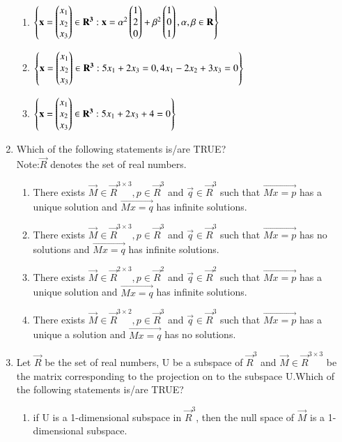 \documentclass[journal,12pt,onecolumn]{IEEEtran}
\theoremstyle{remark}
\begin{document}
\begin{enumerate}
\begin{enumerate}
      \item  $\left\{\mathbf{x}=\begin{pmatrix}x_1\\x_2\\x_3\end{pmatrix} \in \mathbf{R^3}:\mathbf{x}=\alpha^2 \begin{pmatrix}1\\2\\0\end{pmatrix}+\beta^2 \begin{pmatrix}1\\0\\1\end{pmatrix},\alpha,\beta \in \mathbf{R}\right\}$
      \item  $\left\{\mathbf{x}=\begin{pmatrix}x_1\\x_2\\x_3\end{pmatrix} \in \mathbf{R^3}: 5x_1+2x_3=0,4x_1-2x_2+3x_3=0\right\}$
      \item  $\left\{\mathbf{x}=\begin{pmatrix}x_1\\x_2\\x_3\end{pmatrix} \in \mathbf{R^3}:5x_1+2x_3+4=0\right\}$
  \end{enumerate}
  \item Which of the following statements is/are TRUE?\\
  Note:$\vec{R}$ denotes the set of real numbers.
  \begin{enumerate}
      \item There exists $\vec{M}\in \vec{R}^{3\times3},p\in \vec{R}^{3}$ and $\vec{q} \in \vec{R}^3$ such that $\vec{Mx=p}$ has a unique solution and $\vec{Mx=q}$ has infinite solutions.
      \item There exists $\vec{M}\in \vec{R}^{3\times3},p\in \vec{R}^{3}$ and $\vec{q} \in \vec{R}^3$ such that $\vec{Mx=p}$ has no solutions and $\vec{Mx=q}$ has infinite solutions.
      \item There exists $\vec{M}\in \vec{R}^{2\times3},p\in \vec{R}^{2}$ and $\vec{q} \in \vec{R}^2$ such that $\vec{Mx=p}$ has a unique solution and $\vec{Mx=q}$ has infinite solutions.
      \item There exists $\vec{M}\in \vec{R}^{3\times2},p\in \vec{R}^{3}$ and $\vec{q} \in \vec{R}^3$ such that $\vec{Mx=p}$ has a unique a  solution and $\vec{Mx=q}$ has no solutions.
  \end{enumerate}
  \item Let $\vec{R}$ be the set of real numbers, U be a subspace of $\vec{R}^3$ and $\vec{M} \in \vec{R}^{3 \times 3}$ be the matrix corresponding to the projection on to the subspace U.Which of the following statements is/are TRUE?
  \begin{enumerate}
      \item if U is a 1-dimensional subspace in $\vec{R}^3$, then the null space of $\vec{M}$ is a 1-dimensional subspace.

\end{enumerate}
\end{enumerate}
\end{document}
